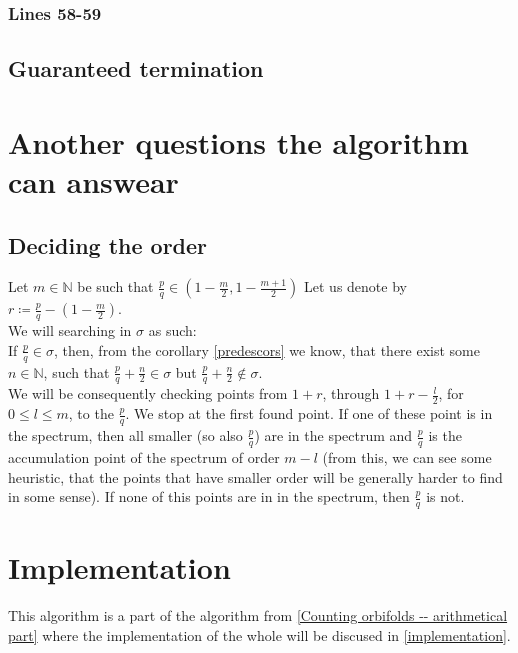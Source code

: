 \subsubsection{Lines 58-59}

\subsection{Guaranteed termination}


\section{Another questions the algorithm can answear}
\subsection{Deciding the order}
Let $m \in \mathbb{N}$ be such that $\frac{p}{q} \in (1-\frac{m}{2},1-
\frac{m+1}{2})$
Let us denote by $r \coloneqq \frac{p}{q} - (1-\frac{m}{2})$. \\ 

We will searching in $\sigma$ as such: \\

If $\frac{p}{q} \in \sigma$, then, from the corollary \ref{predescors} we know, that there 
exist some $n \in \mathbb{N}$, such that $\frac{p}{q} + \frac{n}{2} \in \sigma$ but 
$\frac{p}{q} + \frac{n}{2} \not\in \sigma$. \\

We will be consequently checking points from $1+r$, through $1+r-\frac{l}{2}$, for 
$0 \leq l \leq m$, to the $\frac{p}{q}$. We stop at the first found point. 
If one of these point is in the spectrum, then all smaller (so also $\frac{p}{q}$) are in 
the spectrum and $\frac{p}{q}$ is the accumulation point of the spectrum of order $m-l$ 
(from this, 
we can see some heuristic, that the points that have smaller order will be generally 
harder to find in some sense). If none of this points are in in the spectrum, then $\frac{p}{q}$ 
is not. \\

\section{Implementation}
This algorithm is a part of the algorithm from \ref{Counting orbifolds -- arithmetical part} 
where the implementation of the whole will be discused in \ref{implementation}.
